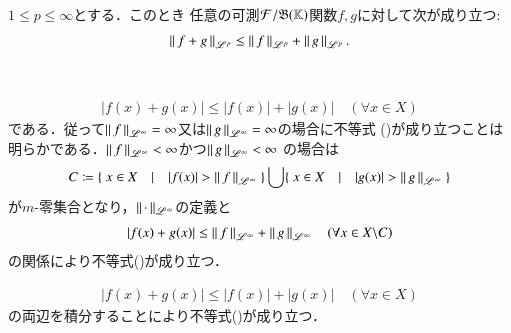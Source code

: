 \begin{thm}[Minkowskiの不等式]
	$1 \leq p \leq \infty$とする．このとき
	任意の可測$\mathcal{F}/\mathfrak{B}(\mathbb{K})$関数$f,g$に対して次が成り立つ:
	\begin{align}
		\left\|\, f+g\, \right\|_{\mathscr{L}^p} \leq \left\|\, f\, \right\|_{\mathscr{L}^p} + \left\|\, g\, \right\|_{\mathscr{L}^p}. \label{ineq:minkowski}
	\end{align}
\end{thm}
\begin{prf}
	\begin{description}\mbox{}\\
		\item[$p = \infty$の場合]
			\begin{align}
				|f(x) + g(x)| \leq |f(x)| + |g(x)| \quad (\forall x \in X)
			\end{align}
			である．従って$\left\|\, f\, \right\|_{\mathscr{L}^\infty} = \infty$又は$\left\|\, g\, \right\|_{\mathscr{L}^\infty} = \infty$の場合に不等式
			()が成り立つことは明らかである．$\left\|\, f\, \right\|_{\mathscr{L}^\infty} < \infty$かつ$\left\|\, g\, \right\|_{\mathscr{L}^\infty} < \infty$
			の場合は
			\begin{align}
				C \coloneqq \{\ x \in X\quad |\quad |f(x)| > \left\|\, f\, \right\|_{\mathscr{L}^\infty}\ \} \bigcup \{\ x \in X\quad |\quad |g(x)| > \left\|\, g\, \right\|_{\mathscr{L}^\infty}\ \}
			\end{align}
			が$m$-零集合となり，$\left\|\, \cdot\, \right\|_{\mathscr{L}^\infty}$の定義と
			\begin{align}
				|f(x) + g(x)| \leq \left\|\, f\, \right\|_{\mathscr{L}^\infty} + \left\|\, g\, \right\|_{\mathscr{L}^\infty} \quad (\forall x \in X \backslash C)
			\end{align}
			の関係により不等式()が成り立つ．
		
		\item[$p = 1$の場合]
			\begin{align}
				|f(x) + g(x)| \leq |f(x)| + |g(x)| \quad (\forall x \in X)
			\end{align}
			の両辺を積分することにより不等式()が成り立つ．
		

\end{description}
\end{prf}
